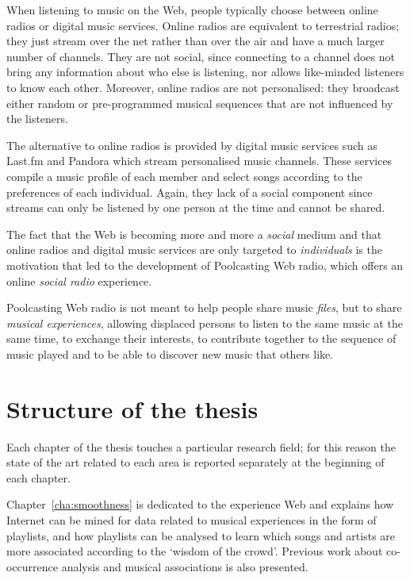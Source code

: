 When listening to music on the Web, people typically choose between online radios or digital music services.
Online radios are equivalent to terrestrial radios; they just stream over the net rather than over the air and have a much larger number of channels.
They are not social, since connecting to a channel does not bring any information about who else is listening, nor allows like-minded listeners to know each other. %
Moreover, online radios are not personalised: they broadcast either random or pre-programmed musical sequences that are not influenced by the listeners.


The alternative to online radios is provided by digital music services such as Last.fm and Pandora which stream personalised music channels.
These services compile a music profile of each member and select songs according to the preferences of each individual.
Again, they lack of a social component since streams can only be listened by one person at the time and cannot be shared. %

The fact that the Web is becoming more and more a \emph{social} medium and that online radios and digital music services are only targeted to \emph{individuals} is the motivation that led to the development of Poolcasting Web radio, which offers an online \emph{social radio} experience.

Poolcasting Web radio is not meant to help people share music \emph{files}, but to share \emph{musical experiences}, allowing displaced persons to listen to the same music at the same time, to exchange their interests, to contribute together to the sequence of music played and to be able to discover new music that others like. 

\section{Structure of the thesis} %
\label{sec:structure_of_the_thesis}

Each chapter of the thesis touches a particular research field; for this reason the state of the art related to each area is reported separately at the beginning of each chapter.

Chapter~\ref{cha:smoothness} is dedicated to the experience Web and explains how Internet can be mined for data related to musical experiences in the form of playlists, and how playlists can be analysed to learn which songs and artists are more associated according to the `wisdom of the crowd'. Previous work about co-occurrence analysis and musical associations is also presented.

